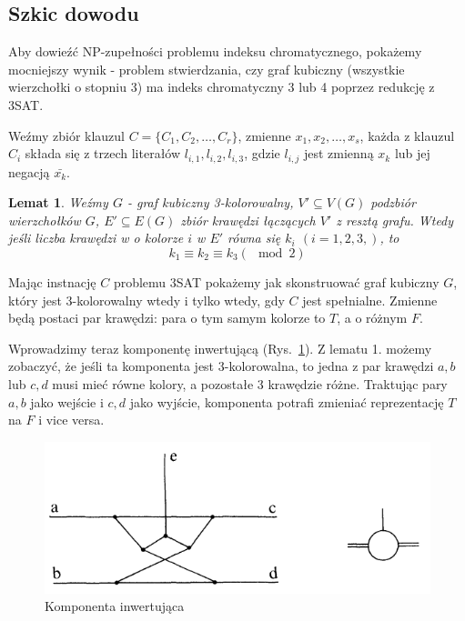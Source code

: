 \documentclass[12pt]{article}
\newtheorem{lemma}{Lemat}
\begin{document}
\subsection{Szkic dowodu}

Aby dowieźć NP-zupełności problemu indeksu chromatycznego, pokażemy mocniejszy wynik {-} problem stwierdzania, czy graf kubiczny (wszystkie wierzchołki o stopniu 3) ma indeks chromatyczny 3 lub 4 poprzez redukcję z 3SAT.

Weźmy zbiór klauzul $C = \{C_1, C_2, \dots, C_r\}$, zmienne $x_1, x_2, \dots, x_s$, każda z klauzul $C_i$ składa się z trzech literałów $l_{i,1},l_{i,2},l_{i,3}$, gdzie $l_{i,j}$ jest zmienną $x_k$ lub jej negacją $\bar{x_k}$.

\begin{lemma}
    Weźmy $G$ {-} graf kubiczny 3-kolorowalny, $V' \subseteq V(G)$ podzbiór wierzchołków $G$, $E' \subseteq E(G)$ zbiór krawędzi łączących $V'$ z resztą grafu. Wtedy jeśli liczba krawędzi w o kolorze $i$ w $E'$ równa się $k_i$ $(i = 1,2,3,)$, to
    \[k_1 \equiv k_2 \equiv k_3(\mod2)\] 
\end{lemma}

Mając instnację $C$ problemu 3SAT pokażemy jak skonstruować graf kubiczny $G$, który jest 3-kolorowalny wtedy i tylko wtedy, gdy $C$ jest spełnialne. Zmienne będą postaci par krawędzi: para o tym samym kolorze to $T$, a o różnym $F$.

Wprowadzimy teraz komponentę inwertującą (Rys.~\ref{fig:inv_component}). Z lematu 1. możemy zobaczyć, że jeśli ta komponenta jest 3-kolorowalna, to jedna z par krawędzi $a,b$ lub $c,d$ musi mieć równe kolory, a pozostałe 3 krawędzie różne. Traktując pary $a,b$ jako wejście i $c,d$ jako wyjście, komponenta potrafi zmieniać reprezentację $T$ na $F$ i vice versa.

\begin{figure}[H]
    \centering
    \includegraphics[scale=1]{inverting_component.PNG}
    \caption{Komponenta inwertująca}
    \label{fig:inv_component}
\end{figure}
\end{document}
